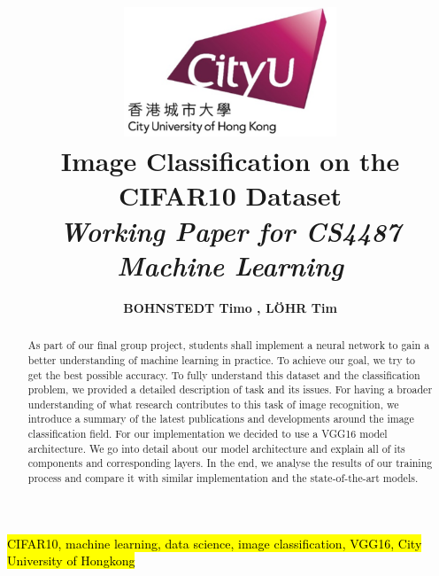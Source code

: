 \documentclass[journal]{IEEEtran}
\begin{document}
    \title{\includegraphics[width=2.5in]{photo/0_cityu} \\
    Image Classification on the CIFAR10 Dataset\\
     \textit{Working Paper for CS4487 Machine Learning}
     }
  \author{\bfseries{BOHNSTEDT 	Timo ,
      L\"OHR Tim}\\ 
}

\maketitle
\begin{abstract}
As part of our final group project, students shall implement a neural network to gain a better understanding of machine learning in practice. To achieve our goal, we try to get the best possible accuracy. To fully understand this dataset and the classification problem, we provided a detailed description of task and its issues. For having a broader understanding of what research contributes to this task of image recognition, we introduce a summary of the latest publications and developments around the image classification field. For our implementation we decided to use a VGG16 model architecture. We go into detail about our model architecture and explain all of its components and corresponding layers. In the end, we analyse the results of our training process and compare it with similar implementation and the state-of-the-art models. 
\end{abstract}

\begin{IEEEkeywords}
\hl{CIFAR10, machine learning, data science, image classification, VGG16, City University of Hongkong}
\end{IEEEkeywords}

\IEEEpeerreviewmaketitle
\end{document}
